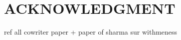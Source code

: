 \documentclass[letterpaper, 10 pt, conference]{ieeeconf}  %
\begin{document}
\addtolength{\textheight}{-12cm}   %








\section*{ACKNOWLEDGMENT}






ref all cowriter paper + paper of sharma sur withmeness



\end{document}
